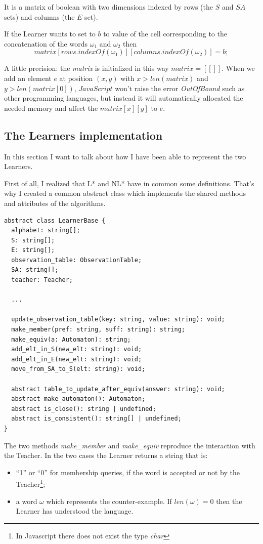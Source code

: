 It is a matrix of boolean with two dimensions indexed by rows (the $S$ and $SA$ sets) and columns (the $E$ set).

If the Learner wants to set to $b$ to value of the cell corresponding to the concatenation of the words $\omega_1$ and $\omega_2$ then
\[matrix[rows.indexOf(\omega_1)][columns.indexOf(\omega_2)] = b;\]

A little precision: the \textit{matrix} is initialized in this way $matrix = [[]]$. When we add an element $e$ at position $(x, y)$ with $x > len(matrix)$ and $y > len(matrix[0])$, $JavaScript$ won't raise the error \textit{OutOfBound} such as other programming languages, but instead it will automatically allocated the needed memory and affect the $matrix[x][y]$ to $e$.

\subsection{The Learners implementation}

In this section I want to talk about how I have been able to represent the two Learners.

First of all, I realized that L* and NL* have in common some definitions. That's why I created a common abstract class which implements the shared methods and attributes of the algorithms.

\begin{lstlisting}[caption = LearnerBase class]
abstract class LearnerBase {
  alphabet: string[];
  S: string[];
  E: string[];
  observation_table: ObservationTable;
  SA: string[];
  teacher: Teacher;

  ...

  update_observation_table(key: string, value: string): void;
  make_member(pref: string, suff: string): string;
  make_equiv(a: Automaton): string;
  add_elt_in_S(new_elt: string): void;
  add_elt_in_E(new_elt: string): void;
  move_from_SA_to_S(elt: string): void;

  abstract table_to_update_after_equiv(answer: string): void;
  abstract make_automaton(): Automaton;
  abstract is_close(): string | undefined;
  abstract is_consistent(): string[] | undefined;
}
\end{lstlisting}

The two methods \textit{make\_member} and \textit{make\_equiv} reproduce the interaction with the Teacher. In the two cases the Learner returns a string that is:

\begin{itemize}
  \item ``1'' or ``0'' for membership queries, if the word is accepted or not by the Teacher\footnote{In Javascript there does not exist the type \textit{char}};
  \item a word $\omega$ which represents the counter-example. If $len(\omega) = 0$ then the Learner has understood the language.
\end{itemize}

